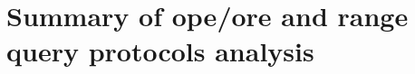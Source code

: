 \chapter{Summary of \acrshort{ope}/\acrshort{ore} and range query protocols analysis}\label{appendix:ore-results}
\thispagestyle{myheadings}

